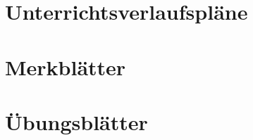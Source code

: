 \begin{appendices}
\section{Unterrichtsverlaufspläne}
\label{app:unterrichtsverlaufspläne}


\label{pdf:UVP1}
\pagebreak


\label{pdf:UVP2}
\pagebreak



\label{pdf:UVP3}
\pagebreak


\section{Merkblätter}
\label{app:merkblätter}
\pagebreak


\label{pdf:Merkblatt_Variablen_if}
\pagebreak


\label{pdf:Merkblatt_if_Listen}
\pagebreak


\label{pdf:Merkblatt_Funktionen}


\section{Übungsblätter}
\label{app:übungsblätter}
\pagebreak


\label{pdf:AB_HTML_CSS}
\pagebreak


\label{pdf:AB_HTML}
\pagebreak


\end{appendices}
